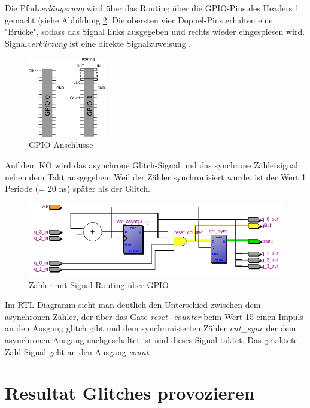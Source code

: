Die Pfad\textit{verlängerung} wird über das Routing über die GPIO-Pins des Headers 1 gemacht (siehe Abbildung \ref{fig.glitch.routing}. Die obersten vier Doppel-Pins erhalten eine "Brücke", sodass das Signal links ausgegeben und rechts wieder eingespiesen wird.\\
Signal\textit{verkürzung} ist eine direkte Signalzuweisung  .\\
\begin{figure}[H]
	\centering
	\includegraphics[width=0.3\textwidth]{images/GPIO_Belegung.png}
	\caption{GPIO Anschlüsse}
	\label{fig.glitch.routing}
\end{figure}

Auf dem KO wird das asynchrone Glitch-Signal und das synchrone Zählersignal neben dem Takt ausgegeben. Weil der Zähler synchronisiert wurde, ist der Wert 1 Periode (= 20 ns) später als der Glitch.\\

\begin{figure}[H]
	\centering
	\includegraphics[width=\textwidth]{images/RTL_glitch_detection_bemalt.png}
	\caption{Zähler mit Signal-Routing über GPIO}
	\label{fig.glitch.routing}
\end{figure}
Im RTL-Diagramm sieht man deutlich den Unterschied zwischen dem asynchronen Zähler, der über das Gate \textit{reset\_{counter}} beim Wert 15 einen Impuls an den Ausgang glitch gibt und dem synchronisierten Zähler \textit{cnt\_{sync}} der dem asynchronen Ausgang nachgeschaltet ist und dieses Signal taktet. Das getaktete Zähl-Signal geht an den Ausgang \textit{count}.


	
\section{Resultat Glitches provozieren}\label{sect.glitch_resultat}

